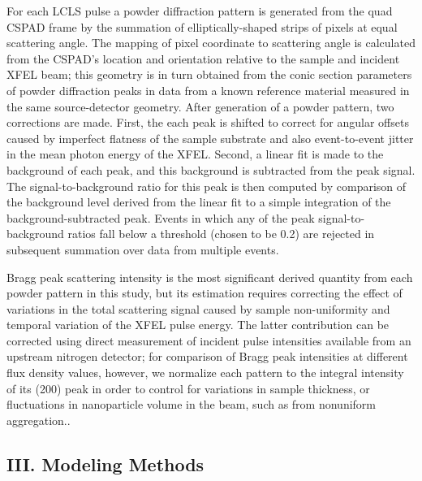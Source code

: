 For each LCLS pulse a powder diffraction pattern is generated from the
quad CSPAD frame by the summation of elliptically-shaped strips of
pixels at equal scattering angle. The mapping of pixel coordinate to
scattering angle is calculated from the CSPAD's location and orientation
relative to the sample and incident XFEL beam; this geometry is in turn
obtained from the conic section parameters of powder diffraction peaks
in data from a known reference material measured in the same
source-detector geometry. After generation of a powder pattern, two
corrections are made. First, the each peak is shifted to correct for
angular offsets caused by imperfect flatness of the sample substrate and
also event-to-event jitter in the mean photon energy of the XFEL.
Second, a linear fit is made to the background of each peak, and this
background is subtracted from the peak signal. The signal-to-background
ratio for this peak is then computed by comparison of the background
level derived from the linear fit to a simple integration of the
background-subtracted peak. Events in which any of the peak
signal-to-background ratios fall below a threshold (chosen to be 0.2)
are rejected in subsequent summation over data from multiple events.

Bragg peak scattering intensity is the most significant derived quantity
from each powder pattern in this study, but its estimation requires
correcting the effect of variations in the total scattering signal
caused by sample non-uniformity and temporal variation of the XFEL pulse
energy. The latter contribution can be corrected using direct
measurement of incident pulse intensities available from an upstream
nitrogen detector; for comparison of Bragg peak intensities at different
flux density values, however, we normalize each pattern to the integral
intensity of its (200) peak in order to control for variations in sample
thickness, or fluctuations in nanoparticle volume in the beam, such as
from nonuniform aggregation..

\subsection{III. Modeling Methods}

